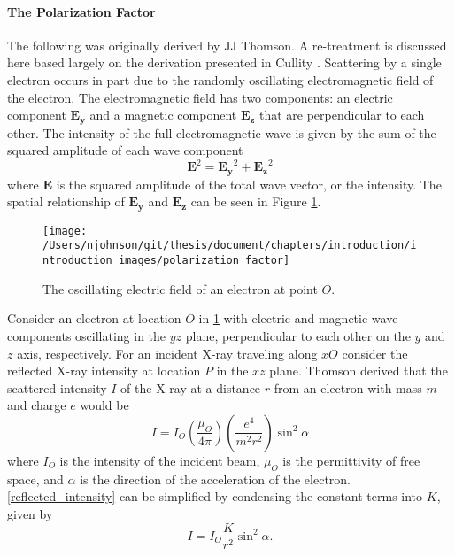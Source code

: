 \paragraph{The Polarization Factor}
The following was originally derived by JJ Thomson. A re-treatment is discussed here based largely on the derivation presented in Cullity \cite{Cullity}. Scattering by a single electron occurs in part due to the randomly oscillating electromagnetic field of the electron. The electromagnetic field has two components: an electric component $\mathbf{E_y}$ and a magnetic component $\mathbf{E_z}$ that are perpendicular to each other. The intensity of the full electromagnetic wave is given by the sum of the squared amplitude of each wave component
\begin{equation}
	\mathbf{E}^2 = \mathbf{E_y} ^2 + \mathbf{E_z}^2
	\label{electromagneticintensity}
\end{equation}
where $\mathbf{E}$ is the squared amplitude of the total wave vector, or the intensity. The spatial relationship of $\mathbf{E_y}$ and $\mathbf{E_z}$ can be seen in Figure \ref{polarization_factor}.

\begin{figure}
	\centering
	\texttt{[image: /Users/njohnson/git/thesis/document/chapters/introduction/introduction\_images/polarization\_factor]}
	\caption{The oscillating electric field of an electron at point $O$.}
	\label{polarization_factor}
\end{figure}

Consider an electron at location $O$ in \ref{polarization_factor} with electric and magnetic wave components oscillating in the $yz$ plane, perpendicular to each other on the $y$ and $z$ axis, respectively. For an incident X-ray traveling along $xO$ consider the reflected X-ray intensity at location $P$ in the $xz$ plane. Thomson derived that the scattered intensity $I$ of the X-ray at a distance $r$ from an electron with mass $m$ and charge $e$ would be
\begin{equation}
	I = I_O \left(\frac{\mu_O}{4\pi}\right) \left(\frac{e^4}{m^2r^2}\right)\sin^2\alpha
	\label{reflected_intensity}
\end{equation}
where $I_O$ is the intensity of the incident beam, $\mu_O$ is the permittivity of free space, and $\alpha$ is the direction of the acceleration of the electron. \ref{reflected_intensity} can be simplified by condensing the constant terms into $K$, given by
\begin{equation}
	I = I_O \frac{K}{r^2}\sin^2\alpha.
	\label{condensed_reflected_intensity}
\end{equation}

